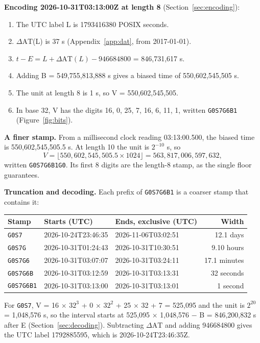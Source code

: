 \documentclass[11pt]{article}
\newcommand{\lit}[1]{\texttt{#1}}
\newcommand{\dAT}{\ensuremath{\Delta\mathrm{AT}}}
\newcommand{\pow}[2]{\ensuremath{#1^{#2}}}
\newcommand{\Sec}[1]{Section~\ref{#1}}
\newcommand{\App}[1]{Appendix~\ref{#1}}
\newcommand{\Fig}[1]{Figure~\ref{#1}}
\begin{document}
\textbf{Encoding 2026-10-31T03:13:00Z at length 8} (\Sec{sec:encoding}):

\begin{enumerate}
\item The UTC label L is 1793416380 POSIX seconds.
\item \dAT(L) is 37 s (\App{app:dat}, from 2017-01-01).
\item $t - E = L + \Delta\mathrm{AT}(L) - 946684800$ = 846,731,617 s.
\item Adding B = 549,755,813,888 s gives a biased time of
550,602,545,505 s.
\item The unit at length 8 is 1 s, so V = 550,602,545,505.
\item In base 32, V has the digits 16, 0, 25, 7, 16, 6, 11, 1, written
\lit{G0S7G6B1} (\Fig{fig:bits}).
\end{enumerate}

{\sloppy\textbf{A finer stamp.} From a millisecond clock reading 03:13:00.500, the
biased time is 550,602,545,505.5 s. At length 10 the unit is \pow{2}{-10} s,
so
\[
V = \lfloor 550{,}602{,}545{,}505.5 \times 1024 \rfloor = 563{,}817{,}006{,}597{,}632,
\]
written \lit{G0S7G6B1G0}. Its first 8 digits are the length-8 stamp, as the
single floor guarantees.\par}

\textbf{Truncation and decoding.} Each prefix of \lit{G0S7G6B1} is a coarser
stamp that contains it:

\begin{center}
\begin{tabular}{@{}lllr@{}}
\toprule
Stamp & Starts (UTC) & Ends, exclusive (UTC) & Width \\
\midrule
\lit{G0S7} & 2026-10-24T23:46:35 & 2026-11-06T03:02:51 & 12.1 days \\
\lit{G0S7G} & 2026-10-31T01:24:43 & 2026-10-31T10:30:51 & 9.10 hours \\
\lit{G0S7G6} & 2026-10-31T03:07:07 & 2026-10-31T03:24:11 & 17.1 minutes \\
\lit{G0S7G6B} & 2026-10-31T03:12:59 & 2026-10-31T03:13:31 & 32 seconds \\
\lit{G0S7G6B1} & 2026-10-31T03:13:00 & 2026-10-31T03:13:01 & 1 second \\
\bottomrule
\end{tabular}
\end{center}

For \lit{G0S7}, V = 16 $\times$ \pow{32}{3} + 0 $\times$ \pow{32}{2} + 25
$\times$ 32 + 7 = 525,095 and the unit is \pow{2}{20} = 1,048,576 s, so the
interval starts at 525,095 $\times$ 1,048,576 $-$ B = 846,200,832 s after E
(\Sec{sec:decoding}). Subtracting \dAT{} and adding 946684800 gives the UTC
label 1792885595, which is 2026-10-24T23:46:35Z.
\end{document}
